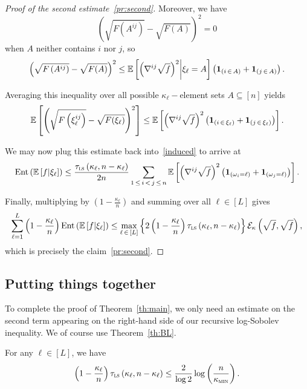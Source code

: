 \documentclass[AHL,Unicode,longabstracts,published]{cedram}
\newcommand{\EE}{\mathbb{E}}
\newcommand{\cE}{\mathcal{E}}
\newcommand{\tls}{\tau_{\textsc{ls}}}
\newcommand{\am}{{\kappa_{\textsc{min}}}}
\newcommand{\bfun}{\bf 1}
\DeclareMathOperator{\ent}{Ent}
\begin{document}
\begin{proof}[Proof of the second estimate~\eqref{pr:second}]
Moreover, we have
\[
\left(\sqrt{F\left(A^{ij}\right)}-\sqrt{F(A)}\right)^2=0
\]
when $A$ neither contains $i$ nor $j$, so
\[
\left(\sqrt{F\left(A^{ij}\right)}-\sqrt{F(A)}\right)^2 \le \EE\left[\left(\nabla^{ij} \sqrt{f}\right)^2\middle|\xi_\ell=A\right]\left({\bfun}_{(i\,\in\,A)}+{\bfun}_{(j\,\in\,A)}\right).
\]

Averaging this inequality over all possible $\kappa_\ell-$element sets $A\subseteq[n]$ yields
\[
\EE\left[\left(\sqrt{F\left(\xi_\ell^{ij}\right)}-\sqrt{F(\xi_\ell)}\right)^2\right] \le \EE\left[\left(\nabla^{ij} \sqrt{f}\right)^2\left({\bfun}_{(i\,\in\,\xi_\ell)}+{\bfun}_{(j\,\in\,\xi_\ell)}\right)\right].
\]

We may now plug this estimate back into~\eqref{induced} to arrive at
\[
\ent\left(\EE\left[f\middle|\xi_\ell\right]\right) \le \frac{\tls\left(\kappa_\ell,n-\kappa_\ell\right)}{2n}\sum_{1\,\le\,i\,<\,j\,\le\,n}\EE\left[\left(\nabla^{ij} \sqrt{f}\right)^2\left({\bfun}_{\left(\omega_i=\ell\right)}+{\bfun}_{\left(\omega_j=\ell\right)}\right)\right].
\]

Finally, multiplying by $\left(1-\frac{\kappa_\ell}{n}\right)$ and summing over all $\ell\in[L]$ gives
\[
\sum_{\ell=1}^L\left(1-\frac{\kappa_\ell}{n}\right)\ent\left(\EE\left[f\middle|\xi_\ell\right]\right) \le \max_{\ell\,\in\,[L]}\left\{2\left(1-\frac{\kappa_\ell}n\right)\tls\left(\kappa_\ell,n-\kappa_\ell\right)\right\}\cE_\kappa\left(\sqrt{f},\sqrt{f}\right),
\]
which is precisely the claim~\eqref{pr:second}.
\end{proof}

\subsection{Putting things together}\label{sec:final}

To complete the proof of Theorem~\ref{th:main}, we only need an estimate on the second term appearing on the right-hand side of our recursive log-Sobolev inequality. We of course use Theorem~\ref{th:BL}.

\begin{lemm}\label{lm:L2}
For any $\ell\in[L]$, we have
\[
\left(1-\frac{\kappa_\ell}{n}\right)\tls\left(\kappa_\ell,n-\kappa_\ell\right) \le \frac{2}{\log 2}\log\left(\frac{n}{\am}\right).
\]
\end{lemm}
\end{document}
